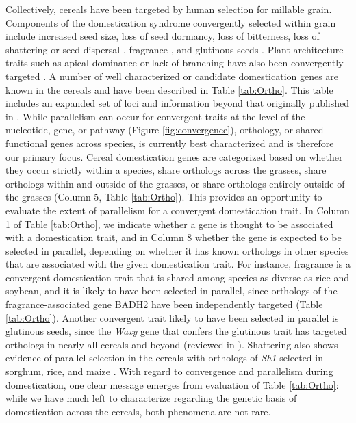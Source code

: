 \documentclass[12pt]{article}
\begin{document}
Collectively, cereals have been targeted by human selection for millable grain.
Components of the domestication syndrome convergently selected within grain include increased seed size, loss of seed dormancy, loss of bitterness, loss of shattering or seed dispersal \citep{Lenser2013}, fragrance \citep{Kellogg2001}, and glutinous seeds \citep{Meyer2013}.
Plant architecture traits such as apical dominance or lack of branching have also been convergently targeted \citep{Lenser2013}.
A number of well characterized or candidate domestication genes are known in the cereals and have been described in Table \ref{tab:Ortho}.
This table includes an expanded set of loci and information beyond that originally published in \citep{Lenser2013}. 
While parallelism can occur for convergent traits at the level of the nucleotide, gene, or pathway  (Figure \ref{fig:convergence}), orthology, or shared functional genes across species, is currently best characterized and is therefore our primary focus.
Cereal domestication genes are categorized based on whether they occur strictly within a species, share orthologs across the grasses, share orthologs within and outside of the grasses, or share orthologs entirely outside of the grasses (Column 5, Table \ref{tab:Ortho}). 
This provides an opportunity to evaluate the extent of parallelism for a convergent domestication trait. 
In Column 1 of Table \ref{tab:Ortho}, we indicate whether a gene is thought to be associated with a domestication trait, and in Column 8 whether the gene is expected to be selected in parallel, depending on whether it has known orthologs in other species that are associated with the given domestication trait. 
For instance, fragrance is a convergent domestication trait that is shared among species as diverse as rice and soybean, and it is likely to have been selected in parallel, since orthologs of the fragrance-associated gene BADH2 have been independently targeted (Table \ref{tab:Ortho}).  
Another convergent trait likely to have been selected in parallel is glutinous seeds, since the \emph{Waxy} gene that confers the glutinous trait has targeted orthologs in nearly all cereals and beyond (reviewed in \citep{Meyer2013}).
Shattering also shows evidence of parallel selection in the cereals with orthologs of \emph{Sh1} selected in sorghum, rice, and maize \citep{Lin2012}.
With regard to convergence and parallelism during domestication, one clear message emerges from evaluation of Table \ref{tab:Ortho}: while we have much left to characterize regarding the genetic basis of domestication across the cereals, both phenomena are not rare.
\end{document}
